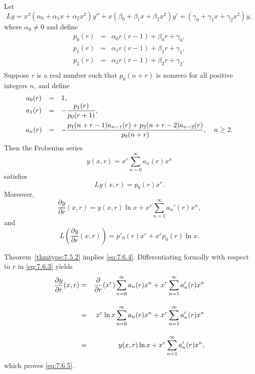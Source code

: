 \begin{theorem}
  \color{blue}
  \label{thmtype:7.6.1} Let
  \begin{equation}
    \label{eq:7.6.2}Ly= x^{2}(\alpha_{0}+\alpha_{1}x+\alpha_{2}x^{2})y''+x(\beta_{0}+\beta_{1}x+\beta_{2}x^{2})y' +(\gamma_{0}+\gamma_{1}x+\gamma_{2}x^{2})y,
  \end{equation}
  where $\alpha_{0}\ne0$ and define
  \begin{eqnarray*}
    p_{0}(r)&=&\alpha_{0}r(r-1)+\beta_{0}r+\gamma_{0},\\[5pt] p_{1}(r)&=&\alpha_{1}r(r-1)+\beta_{1}r+\gamma_{1},\\[5pt] p_{2}(r)&=&\alpha_{2}r(r-1)+\beta_{2}r+\gamma_{2}.\\
  \end{eqnarray*}
  Suppose $r$ is a real number such that $p_{0}(n+r)$ is nonzero for all positive integers $n$, and
  define
  \[
    \begin{array}{ccl}
      a_{0}(r) & = & 1,                                                                                 \\
      a_{1}(r) & = & -\displaystyle\frac{p_{1}(r)}{p_{0}(r+1)},                                                  \\[10pt]
      a_{n}(r) & = & -\displaystyle\frac{p_{1}(n+r-1)a_{n-1}(r)+p_{2}(n+r-2)a_{n-2}(r)}{p_{0}(n+r)},\quad n\ge2.
    \end{array}
  \]
  Then the Frobenius series
  \begin{equation}
    \label{eq:7.6.3}y(x,r)=x^{r}\sum_{n=0}^{\infty}a_{n}(r)x^{n}
  \end{equation}
  satisfies
  \begin{equation}
    \label{eq:7.6.4}Ly(x,r)=p_{0}(r)x^{r}.
  \end{equation}
  Moreover,
  \begin{equation}
    \label{eq:7.6.5}\frac{\partial y}{\partial r}(x,r)=y(x,r)\ln x+x^{r}\sum_{n=1}^{\infty}a_{n}'(r)x^{n},
  \end{equation}
  and
  \begin{equation}
    \label{eq:7.6.6}L\left(\frac{\partial y}{\partial r}(x,r)\right)=p'_{0}(r)x^{r}+x^{r}p_{0}(r)\ln x.
  \end{equation}
\end{theorem}

\proof Theorem~\ref{thmtype:7.5.2} implies \eqref{eq:7.6.4}. Differentiating formally with respect
to $r$ in \eqref{eq:7.6.3} yields
\begin{eqnarray*}
  {\frac{\partial y}{\partial r}}(x,r) & = & \displaystyle{\frac{\partial}{\partial r}(x^{r})\sum_{n=0}^{\infty}a_{n}(r)x^{n}+x^{r}\sum_{n=1}^{\infty}a_{n}'(r)x^{n}} \\[10pt]
                                       & = & \displaystyle{x^{r}\ln x\sum_{n=0}^{\infty}a_{n}(r)x^{n}+x^{r}\sum_{n=1}^{\infty}a_{n}'(r)x^{n}}                         \\[10pt]
                                       & = & y(x,r)\ln x+x^{r}\sum_{n=1}^{\infty}a_{n}'(r)x^{n},
\end{eqnarray*}
which proves \eqref{eq:7.6.5}.

